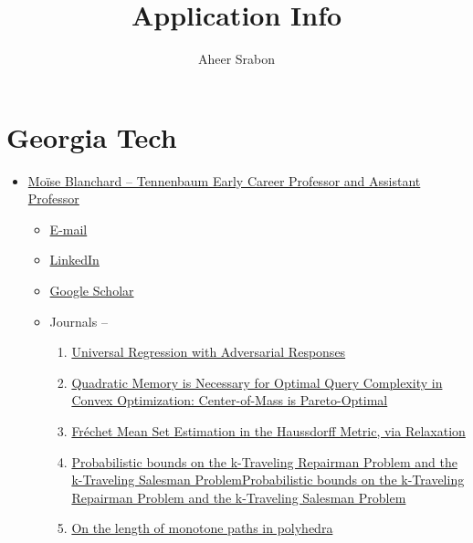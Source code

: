 

\title{Application Info}
\author{Aheer Srabon}


\maketitle

\section{Georgia Tech}
\begin{itemize}
    \item \href{https://moiseb.github.io/}{Moïse Blanchard -- Tennenbaum Early Career Professor and Assistant Professor}
        \begin{itemize}
            \item \href{mailto:mblanchard41@gatech.edu}{E-mail}
            \item \href{https://www.linkedin.com/in/moise-blanchard}{LinkedIn}
            \item \href{https://scholar.google.com/citations?user=kc2SXR0AAAAJ&hl=en&oi=ao}{Google Scholar}
            \item Journals --
                \begin{enumerate}
                    \item \href{https://projecteuclid.org/journals/annals-of-statistics/volume-51/issue-3/Universal-regression-with-adversarial-responses/10.1214/23-AOS2299.full}{Universal Regression with Adversarial Responses}
                    \item \href{https://proceedings.mlr.press/v195/blanchard23a.html}{Quadratic Memory is Necessary for Optimal Query Complexity in Convex Optimization: Center-of-Mass is Pareto-Optimal}
                    \item \href{https://arxiv.org/abs/2212.12057}{Fréchet Mean Set Estimation in the Haussdorff Metric, via Relaxation}
                    \item \href{https://pubsonline.informs.org/doi/10.1287/moor.2021.0286}{Probabilistic bounds on the k-Traveling Repairman Problem and the k-Traveling Salesman ProblemProbabilistic bounds on the k-Traveling Repairman Problem and the k-Traveling Salesman Problem}
                    \item \href{https://epubs.siam.org/doi/abs/10.1137/20M1315646}{On the length of monotone paths in polyhedra}
                \end{enumerate}
        \end{itemize}

\end{itemize}
